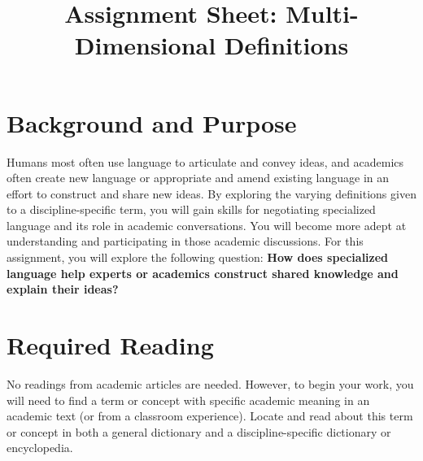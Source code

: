 \documentclass[10pt, oneside,twocolumn]{amsart}	%
\title[Multi-Dimensional Definitions]{Assignment Sheet: Multi-Dimensional Definitions}
\begin{document}
%
\thispagestyle{empty}
\setlength{\columnsep}{.125in}

\section{Background and Purpose} %
\label{sec:background}
Humans most often use language to articulate and convey ideas, and academics often create new language or appropriate and amend existing language in an effort to construct and share new ideas.  By exploring the varying definitions given to a discipline-specific term, you will gain skills for negotiating specialized language and its role in academic conversations.  You will become more adept at understanding and participating in those academic discussions. For this assignment, you will explore the following question:  \textbf{How does specialized language help experts or academics construct shared knowledge and explain their ideas?}

\section{Required Reading} %
\label{sec:readings}
No readings from academic articles are needed. However, to begin your work, you will need to find a term or concept with specific academic meaning in an academic text (or from a classroom experience).  Locate and read about this term or concept in both a general dictionary and a discipline-specific dictionary or encyclopedia. 
\end{document}

